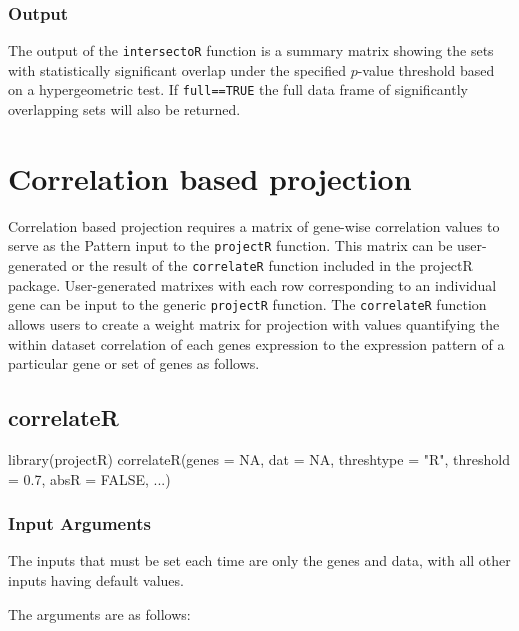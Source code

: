 \documentclass[]{article}
\renewenvironment{verbatim}{\color{codecolor}\begin{myshaded}\begin{oldverbatim}}{\end{oldverbatim}\end{myshaded}}
\begin{document}
\hypertarget{output-3}{%
\subsubsection{Output}\label{output-3}}

The output of the \texttt{intersectoR} function is a summary matrix showing the sets with statistically significant overlap under the specified \(p\)-value threshold based on a hypergeometric test. If \texttt{full==TRUE} the full data frame of significantly overlapping sets will also be returned.

\hypertarget{correlation-based-projection}{%
\section{Correlation based projection}\label{correlation-based-projection}}

Correlation based projection requires a matrix of gene-wise correlation values to serve as the Pattern input to the \texttt{projectR} function. This matrix can be user-generated or the result of the \texttt{correlateR} function included in the projectR package. User-generated matrixes with each row corresponding to an individual gene can be input to the generic \texttt{projectR} function. The \texttt{correlateR} function allows users to create a weight matrix for projection with values quantifying the within dataset correlation of each genes expression to the expression pattern of a particular gene or set of genes as follows.

\hypertarget{correlater}{%
\subsection{correlateR}\label{correlater}}

\begin{verbatim}
library(projectR)
correlateR(genes = NA, dat = NA, threshtype = "R", threshold = 0.7, absR = FALSE, ...)
\end{verbatim}

\hypertarget{input-arguments-4}{%
\subsubsection{Input Arguments}\label{input-arguments-4}}

The inputs that must be set each time are only the genes and data, with all other inputs having default values.

The arguments are as follows:
\end{document}
